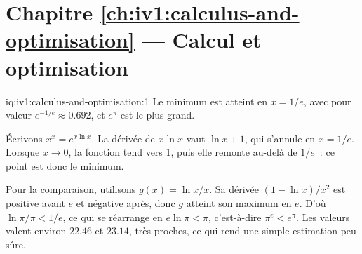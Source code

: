\section*{Chapitre \ref{ch:iv1:calculus-and-optimisation} --- Calcul et optimisation}

\begin{solution}{iq:iv1:calculus-and-optimisation:1}
Le minimum est atteint en $x = 1/e$, avec pour valeur $e^{-1/e} \approx 0.692$, et $e^\pi$ est le plus grand.

Écrivons $x^x = e^{x\ln x}$. La dérivée de $x\ln x$ vaut $\ln x + 1$, qui s'annule en $x = 1/e$. Lorsque $x \to 0$, la fonction tend vers 1, puis elle remonte au-delà de $1/e$~: ce point est donc le minimum.

Pour la comparaison, utilisons $g(x) = \ln x / x$. Sa dérivée $(1 - \ln x)/x^2$ est positive avant $e$ et négative après, donc $g$ atteint son maximum en $e$. D'où $\ln\pi/\pi < 1/e$, ce qui se réarrange en $e\ln\pi < \pi$, c'est-à-dire $\pi^e < e^\pi$. Les valeurs valent environ $22.46$ et $23.14$, très proches, ce qui rend une simple estimation peu sûre.



\end{solution}

